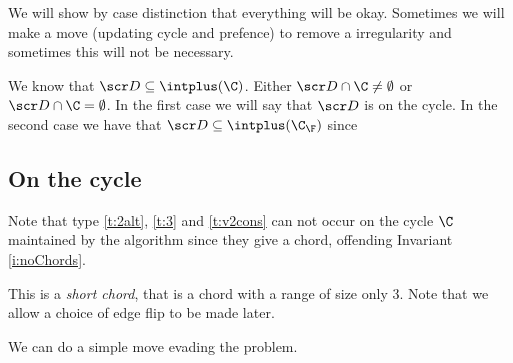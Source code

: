 We will show by case distinction that everything will be okay. Sometimes we will make a move (updating cycle and prefence) to remove a irregularity and sometimes this will not be necessary.



We know that $\D \subseteq \intplus(\C)$. Either $\D \cap \C \neq \emptyset$ or
$\D \cap \C = \emptyset$. In the first case we will say that $\D$ is on the cycle.
In the second case we have that $\D \subseteq \intplus(\C_\F)$ since


\subsection{On the cycle}
  Note that type \ref{t:2alt}, \ref{t:3} and \ref{t:v2cons} can not occur on the cycle $\C$ maintained by the algorithm since they give a chord, offending Invariant \ref{i:noChords}.

  This is a \emph{short chord}, that is a chord with a range of size only 3. Note that we allow a choice of edge flip to be made later.

  We can do a simple move evading the problem.

